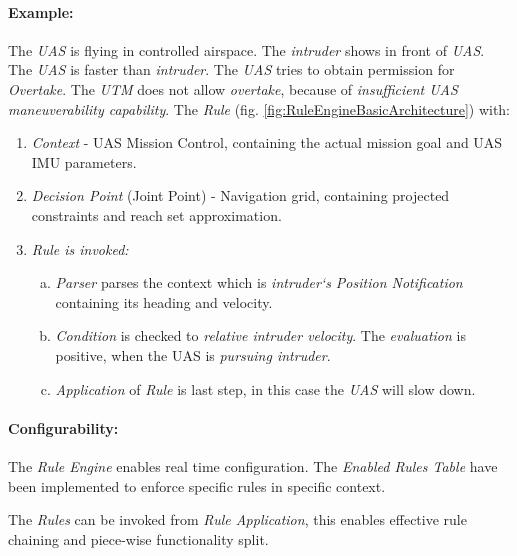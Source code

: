 \paragraph{Example:} The \emph{UAS} is flying in controlled airspace. The \emph{intruder} shows in front of \emph{UAS}. The \emph{UAS} is faster than \emph{intruder}. The \emph{UAS} tries to obtain permission for \emph{Overtake}. The \emph{UTM} does not allow \emph{overtake}, because of \emph{insufficient UAS maneuverability capability}. The \emph{Rule} (fig. \ref{fig:RuleEngineBasicArchitecture}) with:
\begin{enumerate}
    \item \emph{Context} - UAS Mission Control, containing the actual mission goal and UAS IMU parameters. 
    
    \item \emph{Decision Point} (Joint Point) - Navigation grid, containing projected constraints and reach set approximation.
    
    \item \emph{Rule is invoked:}
    \begin{enumerate}[a.]
        \item \emph{Parser} parses the context which is \emph{intruder`s Position Notification} containing its heading and velocity.
        
        \item \emph{Condition} is checked to \emph{relative intruder velocity}. The \emph{evaluation} is positive, when the UAS is \emph{pursuing intruder}.
        
        \item \emph{Application} of \emph{Rule} is last step, in this case the \emph{UAS} will slow down.
    \end{enumerate}
\end{enumerate}

\paragraph{Configurability:} The \emph{Rule Engine} enables real time configuration. The \emph{Enabled Rules Table} have been implemented to enforce specific rules in specific context. 

The \emph{Rules} can be invoked from \emph{Rule Application}, this enables effective rule chaining and piece-wise functionality split. 
